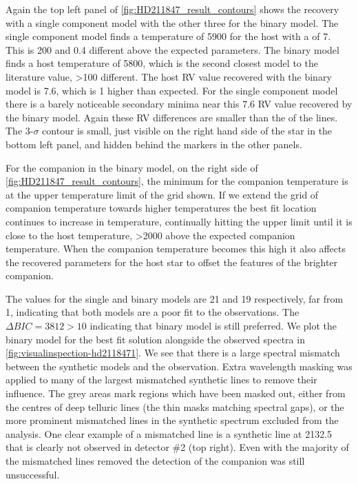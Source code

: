 Again the top left panel of \cref{fig:HD211847_result_contours} shows the recovery with a single component model with the other three for the binary model.
The single component model finds a temperature of 5900\K{} for the host with a \Rvone{} of 7\kmps{}.
This is 200\K{} and 0.4\kmps{} different above the expected parameters.
The binary model finds a host temperature of 5800\K{}, which is the second closest model to the literature value, >100\K{} different.
The host {RV} value recovered with the binary model is 7.6\kmps{}, which is 1\kmps{} higher than expected.
For the single component model there is a barely noticeable secondary minima near this 7.6\kmps{} {RV} value recovered by the binary model.
Again these {RV} differences are smaller than the {\fwhm} of the lines.
The 3-\(\sigma\) contour is small, just visible on the right hand side of the star in the bottom left panel, and hidden behind the markers in the other panels.


For the companion in the binary model, on the right side of \cref{fig:HD211847_result_contours}, the minimum \textchisquared{} for the companion temperature is at the upper temperature limit of the grid shown.
If we extend the grid of companion temperature towards higher temperatures the best fit location continues to increase in temperature, continually hitting the upper limit until it is close to the host temperature, >2000\K{} above the expected companion temperature.
When the companion temperature becomes this high it also affects the recovered parameters for the host star to offset the features of the brighter companion.

The \textchisquaredreduced{} values for the single and binary models are 21 and 19 respectively, far from 1, indicating that both models are a poor fit to the observations.
{\red{} The $\Delta {BIC} = 3812 >10$ indicating that binary model is still preferred.} We plot the binary model for the best fit solution alongside the observed spectra in \cref{fig:visualinspection-hd2118471}.
We see that there is a large spectral mismatch between the synthetic models and the observation.
Extra wavelength masking was applied to many of the largest mismatched synthetic lines to remove their influence.
The grey areas mark regions which have been masked out, either from the centres of deep telluric lines (the thin masks matching spectral gaps), or the more prominent mismatched lines in the synthetic spectrum excluded from the \textchisquared{} analysis.
One clear example of a mismatched line is a synthetic line at 2132.5\nm{} that is clearly not observed in detector \#2 (top right).
Even with the majority of the mismatched lines removed the detection of the companion was still unsuccessful.

